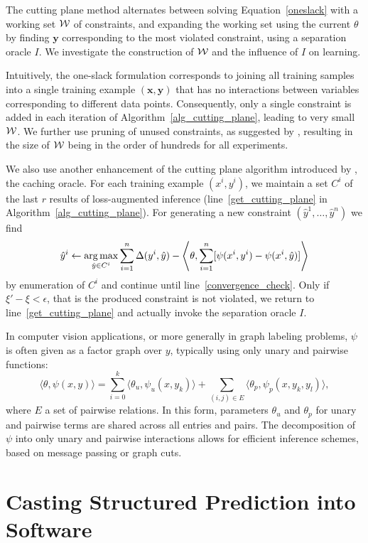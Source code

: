 The cutting plane method alternates between solving Equation~\eqref{oneslack}
with a working set $\mathcal{W}$ of constraints, and expanding the working set using the
current $\theta$ by finding $\mathbf{y}$ corresponding to the most violated constraint,
using a separation oracle $I$.
We investigate the construction of $\mathcal{W}$ and the influence of $I$
on learning.


Intuitively, the one-slack formulation corresponds to joining all training
samples into a single training example $(\mathbf{x}, \mathbf{y})$ that has no
interactions between variables corresponding to different data points.
Consequently, only a single constraint is added in each iteration of
Algorithm~\ref{alg_cutting_plane}, leading to very small $\mathcal{W}$. We further use
pruning of unused constraints, as suggested by \citet{joachims2009cutting},
resulting in the size of $\mathcal{W}$ being in the order of hundreds for all experiments.

We also use another enhancement of the cutting plane algorithm introduced by
\citet{joachims2009cutting}, the caching oracle. For each training example $(x^i, y^i)$,
we maintain a set $C^i$ of the last $r$ results of loss-augmented inference
(line~\ref{get_cutting_plane} in Algorithm~\ref{alg_cutting_plane}).
For generating a new constraint $(\hat{y}^1, \dotsc, \hat{y}^n)$ we find
\[ 
    \hat{y}^i \leftarrow \operatorname*{arg\,max}_{\hat{y}\in C^i} \sum_{i=1}^n \Delta(y^i, \hat{y}) - \left \langle \theta, \sum_{i=1}^n [\psi(x^i, y^i) - \psi(x^i, \hat{y})] \right \rangle
\]
by enumeration of $C^i$ and continue until line~\ref{convergence_check}.
Only if $\xi' - \xi < \epsilon$, that is the produced constraint is not violated, we
return to line~\ref{get_cutting_plane} and actually invoke the separation
oracle $I$.

In computer vision applications, or more generally in graph labeling problems,
$\psi$ is often given as a factor graph over $y$, typically using only unary and pairwise functions:
\[ \langle \theta, \psi(x, y) \rangle = \sum_{i=0}^k \langle \theta_u,  \psi_u(x, y_k) \rangle + \sum_{(i, j) \in E} \langle \theta_p, \psi_p(x, y_k, y_l) \rangle, \]
where $E$ a set of pairwise relations. In this form, parameters $\theta_u$ and $\theta_p$ for unary and
pairwise terms are shared across all entries and pairs.
The decomposition of $\psi$ into only unary and pairwise interactions allows
for efficient inference schemes, based on message passing or graph cuts.


\section{Casting Structured Prediction into Software}\label{sec:api}

